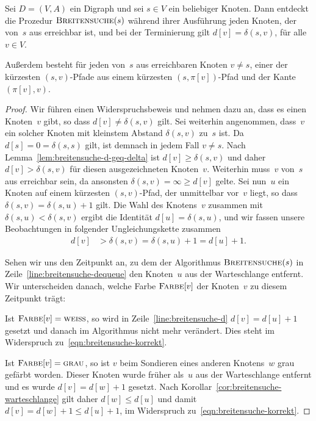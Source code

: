 \begin{thm}
\label{thm:breitensuche}
Sei $D=(V,A)$ ein Digraph und sei $s \in V$ ein beliebiger Knoten.
Dann entdeckt die Prozedur $\mathop{\text{\textsc{Breitensuche}}}(s)$ während ihrer Ausführung jeden Knoten, der von~$s$ aus erreichbar ist, und bei der Terminierung gilt $d[v] = \delta(s,v)$, für alle $v \in V$.

Außerdem besteht für jeden von~$s$ aus erreichbaren Knoten $v \neq s$, einer der kürzesten $(s,v)$-Pfade aus einem kürzesten $(s,\pi[v])$-Pfad und der Kante $(\pi[v],v)$.
\end{thm}

\begin{proof}
Wir führen einen Widerspruchsbeweis und nehmen dazu an, dass es einen Knoten~$v$ gibt, so dass $d[v] \neq \delta(s,v)$ gilt.
Sei weiterhin angenommen, dass~$v$ ein solcher Knoten mit kleinstem Abstand $\delta(s,v)$ zu~$s$ ist.
Da $d[s]=0=\delta(s,s)$ gilt, ist demnach in jedem Fall $v \neq s$.
Nach Lemma~\ref{lem:breitensuche-d-geq-delta} ist $d[v] \geq \delta(s,v)$ und daher $d[v] > \delta(s,v)$ für diesen ausgezeichneten Knoten~$v$.
Weiterhin muss~$v$ von~$s$ aus erreichbar sein, da ansonsten $\delta(s,v)=\infty \geq d[v]$ gelte.
Sei nun~$u$ ein Knoten auf einem kürzesten $(s,v)$-Pfad, der unmittelbar vor~$v$ liegt, so dass $\delta(s,v)=\delta(s,u)+1$ gilt.
Die Wahl des Knotens~$v$ zusammen mit $\delta(s,u) < \delta(s,v)$ ergibt die Identität $d[u]=\delta(s,u)$, und wir fassen unsere Beobachtungen in folgender Ungleichungskette zusammen
\begin{align}
d[v] &> \delta(s,v) = \delta(s,u) + 1 = d[u] + 1.\label{eqn:breitensuche-korrekt}
\end{align}

Sehen wir uns den Zeitpunkt an, zu dem der Algorithmus $\mathop{\text{\textsc{Breitensuche}}}(s)$ in Zeile~\ref{line:breitensuche-dequeue} den Knoten~$u$ aus der Warteschlange entfernt.
Wir unterscheiden danach, welche Farbe $\mathop{\text{\textsc{Farbe}}}[v]$ der Knoten~$v$ zu diesem Zeitpunkt trägt:

Ist $\mathop{\text{\textsc{Farbe}}}[v]=\mathop{\text{\textsc{weiss}}}$, so wird in Zeile~\ref{line:breitensuche-d} $d[v]=d[u]+1$ gesetzt und danach im Algorithmus nicht mehr verändert.
Dies steht im Widerspruch zu~\eqref{eqn:breitensuche-korrekt}.

Ist $\mathop{\text{\textsc{Farbe}}}[v]=\mathop{\text{\textsc{grau}}}$, so ist $v$ beim Sondieren eines anderen Knotens~$w$  grau gefärbt worden.
Dieser Knoten wurde früher als~$u$ aus der Warteschlange entfernt und es wurde $d[v]=d[w]+1$ gesetzt.
Nach Korollar~\ref{cor:breitensuche-warteschlange} gilt daher $d[w] \leq d[u]$ und damit $d[v]=d[w]+1 \leq d[u]+1$, im Widerspruch zu~\eqref{eqn:breitensuche-korrekt}.


\end{proof}
